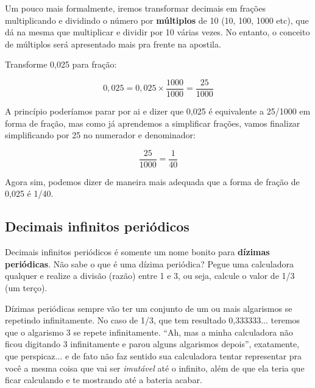 \begin{tcolorbox}[title=IMPORTANTE]
    Um pouco mais formalmente, iremos transformar decimais em frações multiplicando e dividindo o número por \textbf{múltiplos} de 10 (10, 100, 1000 etc), que dá na mesma que multiplicar e dividir por 10 várias vezes. No entanto, o conceito de múltiplos será apresentado mais pra frente na apostila. 
\end{tcolorbox}

\begin{exemplo}
    Transforme 0,025 para fração:

    \begin{equation}
        0,025=0,025\times\frac{1000}{1000}=\frac{25}{1000}
    \end{equation}

    A princípio poderíamos parar por ai e dizer que 0,025 é equivalente a 25/1000 em forma de fração, mas como já aprendemos a simplificar frações, vamos finalizar simplificando por 25 no numerador e denominador:

    \begin{equation}
        \frac{25}{1000}=\frac{1}{40}
    \end{equation}

    Agora sim, podemos dizer de maneira mais adequada que a forma de fração de 0,025 é 1/40.
\end{exemplo}







\subsection{Decimais infinitos periódicos}

Decimais infinitos periódicos é somente um nome bonito para \textbf{dízimas periódicas}. Não sabe o que é uma dízima periódica? Pegue uma calculadora qualquer e realize a divisão (razão) entre 1 e 3, ou seja, calcule o valor de 1/3 (um terço).

Dízimas periódicas sempre vão ter um conjunto de um ou mais algarismos se repetindo infinitamente. No caso de 1/3, que tem resultado 0,333333... teremos que o algarismo 3 se repete infinitamente. ``Ah, mas a minha calculadora não ficou digitando 3 infinitamente e parou alguns algarismos depois'', exatamente, que perspicaz... e de fato não faz sentido sua calculadora tentar representar pra você a mesma coisa que vai ser \textit{imutável} até o infinito, além de que ela teria que ficar calculando e te mostrando até a bateria acabar. 


